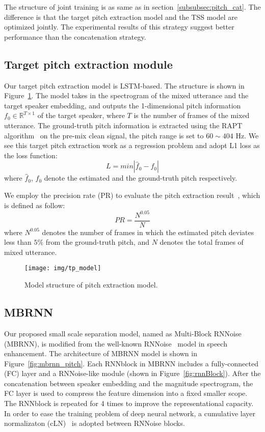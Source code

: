 The structure of joint training is as same as in section~\ref{subsubsec:pitch_cat}.
The difference is that the target pitch extraction model and the TSS model are optimized jointly. The experimental results of this strategy suggest better performance than the concatenation strategy.

\subsection{Target pitch extraction module}
\label{subsec:pitch_model}
Our target pitch extraction model is LSTM-based. The structure is shown in Figure~\ref{fig:tp_extraction}.
The model takes in the spectrogram of the mixed utterance and the target speaker embedding, and outputs the 1-dimensional pitch information $f_0\in\mathbb{R}^{T\times 1}$ of the target speaker, where $T$ is the number of frames of the mixed utterance.
The ground-truth pitch information is extracted using the RAPT algorithm~\cite{Talkin2005ARA} on the pre-mix clean signal, the pitch range is set to $60\sim404$ Hz.
We see this target pitch extraction work as a regression problem and adopt L1 loss as the loss function:
\begin{equation}
    L = min|\hat{f}_{0}-f_{0}|
\end{equation}
where $\hat{f}_{0}$, $f_{0}$ denote the estimated and the ground-truth pitch respectively.

We employ the precision rate (PR) to evaluate the pitch extraction result~\cite{zhang16d_interspeech}, which is defined as follow:
\begin{equation}
    PR =\frac{N^{0.05}}{N}
\end{equation}
where ${N^{0.05}}$ denotes the number of frames in which the estimated pitch deviates less than $5\%$ from the ground-truth pitch, and $N$ denotes the total frames of mixed utterance.

\begin{figure}[t]
    \centering
    \texttt{[image: img/tp\_model]}
    \caption{Model structure of pitch extraction model.}
    \label{fig:tp_extraction}
\end{figure}

\subsection{MBRNN}
\label{subsec:mbrnn_model}
Our proposed small scale separation model, named as Multi-Block RNNoise (MBRNN), is modified from the well-known RNNoise~\cite{rnnoise} model in speech enhancement.
The architecture of MBRNN model is shown in Figure~\ref{fig:mbrnn_pitch}. Each RNNblock in MBRNN includes a fully-connected (FC) layer and a RNNoise-like module (shown in Figure~\ref{fig:rnnBlock}).
After the concatenation between speaker embedding and the magnitude spectrogram, the FC layer is used to compress the feature dimension into a fixed smaller scope.
The RNNblock is repeated for 4 times to improve the representational capacity.
In order to ease the training problem of deep neural network, a cumulative layer normalizaton (cLN)~\cite{conv_tasnet} is adopted between RNNoise blocks.

